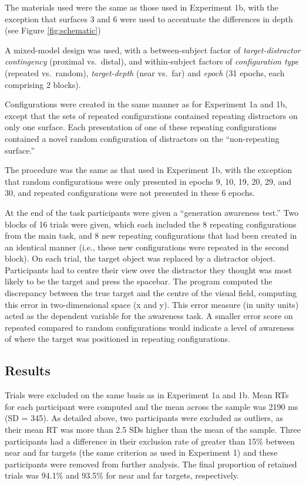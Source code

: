 \documentclass[
  english,
  man,floatsintext]{apa7}
\begin{document}
The materials used were the same as those used in Experiment 1b, with the exception that surfaces 3 and 6 were used to accentuate the differences in depth (see Figure \ref{fig:schematic})

A mixed-model design was used, with a between-subject factor of \emph{target-distractor contingency} (proximal vs.~distal), and within-subject factors of \emph{configuration type} (repeated vs.~random), \emph{target-depth} (near vs.~far) and \emph{epoch} (31 epochs, each comprising 2 blocks).

Configurations were created in the same manner as for Experiment 1a and 1b, except that the sets of repeated configurations contained repeating distractors on only one surface. Each presentation of one of these repeating configurations contained a novel random configuration of distractors on the ``non-repeating surface.''

The procedure was the same as that used in Experiment 1b, with the exception that random configurations were only presented in epochs 9, 10, 19, 20, 29, and 30, and repeated configurations were not presented in these 6 epochs.

At the end of the task participants were given a ``generation awareness test.'' Two blocks of 16 trials were given, which each included the 8 repeating configurations from the main task, and 8 new repeating configurations that had been created in an identical manner (i.e., these new configurations were repeated in the second block). On each trial, the target object was replaced by a distractor object. Participants had to centre their view over the distractor they thought was most likely to be the target and press the spacebar. The program computed the discrepancy between the true target and the centre of the visual field, computing this error in two-dimensional space (x and y). This error measure (in unity units) acted as the dependent variable for the awareness task. A smaller error score on repeated compared to random configurations would indicate a level of awareness of where the target was positioned in repeating configurations.

\hypertarget{results-1}{%
\subsection{Results}\label{results-1}}

Trials were excluded on the same basis as in Experiment 1a and 1b. Mean RTs for each participant were computed and the mean across the sample was 2190 ms (SD = 345). As detailed above, two participants were excluded as outliers, as their mean RT was more than 2.5 SDs higher than the mean of the sample. Three participants had a difference in their exclusion rate of greater than 15\% between near and far targets (the same criterion as used in Experiment 1) and these participants were removed from further analysis. The final proportion of retained trials was 94.1\% and 93.5\% for near and far targets, respectively.
\end{document}
